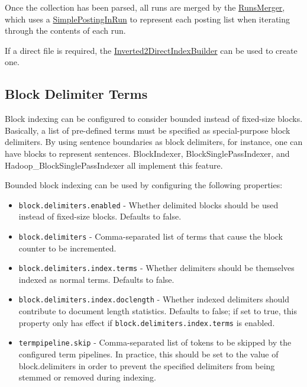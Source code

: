Once the collection has been parsed, all runs are merged by the
\href{javadoc/org/terrier/structures/indexing/singlepass/RunsMerger.html}{RunsMerger},
which uses a
\href{javadoc/org/terrier/structures/indexing/singlepass/SimplePostingInRun.html}{SimplePostingInRun}
to represent each posting list when iterating through the contents of
each run.

If a direct file is required, the
\href{javadoc/org/terrier/structures/indexing/singlepass/Inverted2DirectIndexBuilder.html}{Inverted2DirectIndexBuilder}
can be used to create one.

\subsection{Block Delimiter Terms}\label{block-delimiter-terms}

Block indexing can be configured to consider bounded instead of
fixed-size blocks. Basically, a list of pre-defined terms must be
specified as special-purpose block delimiters. By using sentence
boundaries as block delimiters, for instance, one can have blocks to
represent sentences. BlockIndexer, BlockSinglePassIndexer, and
Hadoop\_BlockSinglePassIndexer all implement this feature.

Bounded block indexing can be used by configuring the following
properties:

\begin{itemize}
\tightlist
\item
  \texttt{block.delimiters.enabled} - Whether delimited blocks should be
  used instead of fixed-size blocks. Defaults to false.
\item
  \texttt{block.delimiters} - Comma-separated list of terms that cause
  the block counter to be incremented.
\item
  \texttt{block.delimiters.index.terms} - Whether delimiters should be
  themselves indexed as normal terms. Defaults to false.
\item
  \texttt{block.delimiters.index.doclength} - Whether indexed delimiters
  should contribute to document length statistics. Defaults to false; if
  set to true, this property only has effect if
  \texttt{block.delimiters.index.terms} is enabled.
\item
  \texttt{termpipeline.skip} - Comma-separated list of tokens to be
  skipped by the configured term pipelines. In practice, this should be
  set to the value of block.delimiters in order to prevent the specified
  delimiters from being stemmed or removed during indexing.
\end{itemize}

